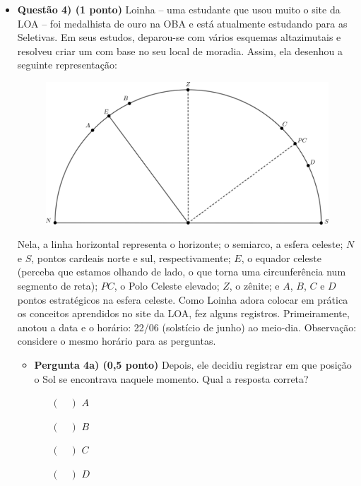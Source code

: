 \documentclass{../lista}
\begin{document}
	\begin{itemize}
		\item \textbf{Questão 4) (1 ponto)} Loinha -- uma estudante que usou muito o site da LOA -- foi medalhista de ouro na OBA e está atualmente estudando para as Seletivas. Em seus estudos, deparou-se com vários esquemas altazimutais e resolveu criar um com base no seu local de moradia. Assim, ela desenhou a seguinte representação:
			\begin{figure}[H]
				\centering
				\includegraphics[scale=1.2]{./img/4.png}
			\end{figure}
			Nela, a linha horizontal representa o horizonte; o semiarco, a esfera celeste; $N$ e $S$, pontos cardeais norte e sul, respectivamente; $E$, o equador celeste (perceba que estamos olhando de lado, o que torna uma circunferência num segmento de reta); $PC$, o Polo Celeste elevado; $Z$, o zênite; e $A$, $B$, $C$ e $D$ pontos estratégicos na esfera celeste. \linebreak
			Como Loinha adora colocar em prática os conceitos aprendidos no site da LOA, fez alguns registros. Primeiramente, anotou a data e o horário: 22/06 (solstício de junho) ao meio-dia.\linebreak
			Observação: considere o mesmo horário para as perguntas.
			\begin{itemize}
				\item \textbf{Pergunta 4a) (0,5 ponto)} Depois, ele decidiu registrar em que posição o Sol se encontrava naquele momento. Qual a resposta correta?
					\begin{itemize}
						\item[$(\quad)$] $A$
						\item[$(\quad)$] $B$
						\item[$(\quad)$] $C$
						\item[$(\quad)$] $D$
					\end{itemize}

\end{itemize}
\end{itemize}
\end{document}
